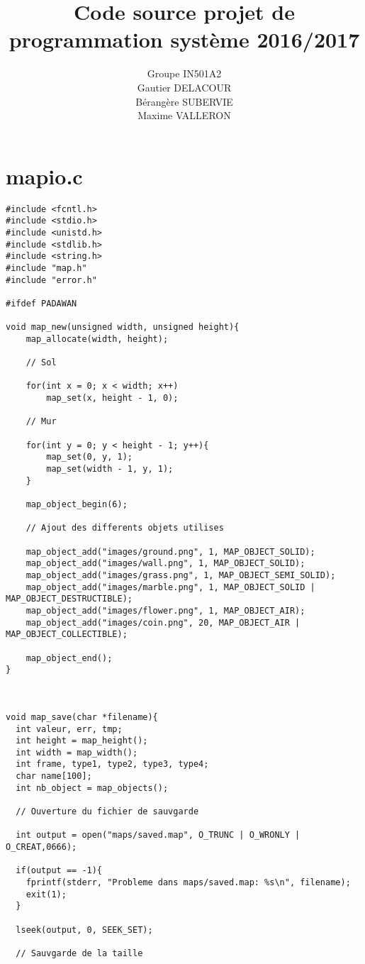 \documentclass{report}
\title{Code source projet de programmation système 2016/2017}
\author{Groupe IN501A2\\Gautier DELACOUR\\Bérangère SUBERVIE\\Maxime VALLERON}
\begin{document}
\maketitle
\tableofcontents

\chapter{mapio.c}

    \begin{lstlisting}
#include <fcntl.h>
#include <stdio.h>
#include <unistd.h>
#include <stdlib.h>
#include <string.h>
#include "map.h"
#include "error.h"

#ifdef PADAWAN

void map_new(unsigned width, unsigned height){
	map_allocate(width, height);
  
	// Sol
  
	for(int x = 0; x < width; x++)
		map_set(x, height - 1, 0);
  
	// Mur
  
	for(int y = 0; y < height - 1; y++){
		map_set(0, y, 1);
		map_set(width - 1, y, 1);
	}
    
	map_object_begin(6);
  
	// Ajout des differents objets utilises
  
	map_object_add("images/ground.png", 1, MAP_OBJECT_SOLID); 
	map_object_add("images/wall.png", 1, MAP_OBJECT_SOLID); 
	map_object_add("images/grass.png", 1, MAP_OBJECT_SEMI_SOLID);
	map_object_add("images/marble.png", 1, MAP_OBJECT_SOLID | MAP_OBJECT_DESTRUCTIBLE);
	map_object_add("images/flower.png", 1, MAP_OBJECT_AIR);
	map_object_add("images/coin.png", 20, MAP_OBJECT_AIR | MAP_OBJECT_COLLECTIBLE);
  
	map_object_end();
}



void map_save(char *filename){
  int valeur, err, tmp;
  int height = map_height(); 
  int width = map_width();
  int frame, type1, type2, type3, type4;
  char name[100];
  int nb_object = map_objects();
  
  // Ouverture du fichier de sauvgarde
  
  int output = open("maps/saved.map", O_TRUNC | O_WRONLY | O_CREAT,0666);
  
  if(output == -1){
    fprintf(stderr, "Probleme dans maps/saved.map: %s\n", filename);
    exit(1);
  }
  
  lseek(output, 0, SEEK_SET);
  
  // Sauvgarde de la taille
  

\end{lstlisting}
\end{document}
